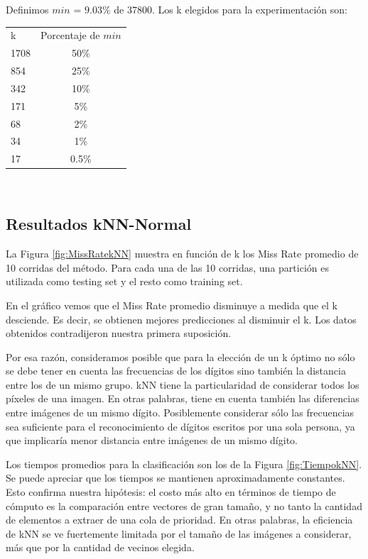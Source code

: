 \documentclass{article}
\begin{document}
Definimos $min$ = $9.03\%$ de 37800. Los k elegidos para la experimentación son: \newline
\begin{center}
\begin{tabular}{ l | c }
 k & Porcentaje de $min$  \\
1708 & 50\% \\
854 & 25\% \\
342 & 10\% \\
171 & 5\% \\
68 & 2\% \\
34 & 1\% \\
17& 0.5\% \\

\end{tabular}
\end{center}
\\

\subsection*{Resultados kNN-Normal}

La Figura \ref{fig:MissRatekNN} muestra en función de k  los Miss Rate promedio de 10 corridas del método. Para cada una de las 10 corridas, una partición es utilizada como testing set y el resto como training set.

En el gráfico vemos que el Miss Rate promedio disminuye a medida que el k desciende. Es decir, se obtienen mejores predicciones al disminuir el k. Los datos obtenidos contradijeron nuestra primera suposición.

Por esa razón, consideramos posible que para la elección de un k óptimo no sólo se debe tener en cuenta las frecuencias de los dígitos sino también la distancia entre los de un mismo grupo. kNN tiene la particularidad de considerar todos los píxeles de una imagen. En otras palabras, tiene en cuenta también las diferencias entre imágenes de un mismo dígito. Posiblemente considerar sólo las frecuencias sea suficiente para el reconocimiento de dígitos escritos por una sola persona, ya que implicaría menor distancia entre imágenes de un mismo dígito.

Los tiempos promedios para la clasificación son los de la Figura \ref{fig:TiempokNN}. Se puede apreciar que los tiempos se mantienen aproximadamente constantes. Esto confirma nuestra hipótesis: el costo más alto en términos de tiempo de cómputo es la comparación entre vectores de gran tamaño, y no tanto la cantidad de elementos a extraer de una cola de prioridad. En otras palabras, la eficiencia de kNN se ve fuertemente limitada por el tamaño de las imágenes a considerar, más que por la cantidad de vecinos elegida.
\end{document}
